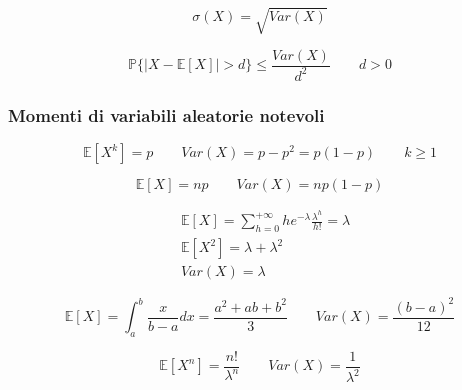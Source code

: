 \begin{definition}
	\begin{equation}
		\sigma(X) = \sqrt{Var(X)}
	\end{equation}
\end{definition}

\begin{definition}
	\begin{equation}
		\mathbb{P}\{\lvert X -\mathbb{E}[X] \rvert > d\} \leq \frac{Var(X)}{d^2} \quad\quad d>0
	\end{equation}
\end{definition}
\subsubsection{Momenti di variabili aleatorie notevoli}
\begin{proposition}
	\begin{equation}
		\mathbb{E}[X^k] = p \quad\quad Var(X) = p-p^2 = p(1-p) \quad \quad k \geq 1
	\end{equation}
\end{proposition}
\begin{proposition}
	\begin{equation}
		\mathbb{E}[X] = np \quad\quad Var(X) = np(1-p)
	\end{equation}
\end{proposition}

\begin{proposition}
	\begin{align}
		& \mathbb{E}[X] = \sum_{h=0}^{+\infty}he^{-\lambda} \frac{\lambda^h}{h!}=\lambda\\
		& \mathbb{E}[X^2] = \lambda + \lambda^2 \\
		& Var(X) = \lambda
	\end{align}
\end{proposition}

\begin{proposition}
	\begin{equation}
		\mathbb{E}[X] = \int_{a}^{b} \frac{x}{b-a}dx = \frac{a^2+ab+b^2}{3} \quad\quad Var(X) = \frac{(b-a)^2}{12}
	\end{equation}
\end{proposition}

\begin{proposition}
	\begin{equation}
		\mathbb{E}[X^n] = \frac{n!}{\lambda^n} \quad\quad Var(X) =\frac{1}{\lambda^2}
	\end{equation}
\end{proposition}

